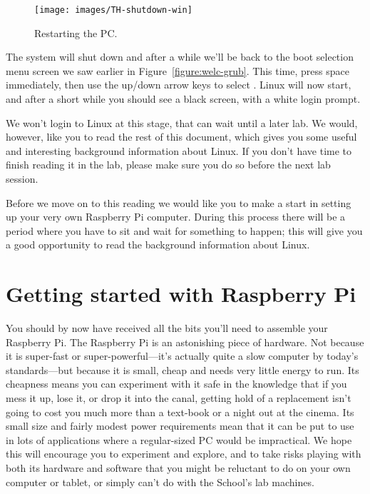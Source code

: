 \begin{figure}
\centerline{\texttt{[image: images/TH-shutdown-win]}}
\caption{Restarting the PC.}
\label{figure:welc-restart}
\end{figure}

The system will shut down and after a while we'll be back to the boot selection menu
screen we saw earlier in Figure~\ref{figure:welc-grub}. This time, press space immediately, then use
the up/down arrow keys to select . Linux will now start, and after a short while you should
see a black screen, with a white login prompt.

\pgtcommand{\endinput}
We won't login to Linux
at this stage, that can wait until a later lab. We would,
however, like you to read the rest of this document, which gives you
some useful and interesting background information about Linux. If you
don't have time to finish reading it in the lab, please make sure you
do so before the next lab session.

Before we move on to this reading we would like you to make a start in setting up your very own Raspberry Pi computer. During this process there will be a period where you have to sit and wait for something to happen; this will give you a good opportunity to read the background information about Linux.

\section{Getting started with Raspberry Pi}

You should by now have received all the bits you'll need to assemble your Raspberry Pi. The Raspberry Pi is an astonishing piece of hardware. Not because it is super-fast or super-powerful---it's actually quite a slow computer by today's standards---but because it is small, cheap and needs very little energy to run. Its cheapness means you can experiment with it safe in the knowledge that if you mess it up, lose it, or drop it into the canal, getting hold of a replacement isn't going to cost you much more than a text-book or a night out at the cinema. Its small size and fairly modest power requirements mean that it can be put to use in lots of applications where a regular-sized PC would be impractical.  We hope this will encourage you to experiment and explore, and to take risks playing with both its hardware and software that you might be reluctant to do on your own computer or tablet, or simply can't do with the School's lab machines.

